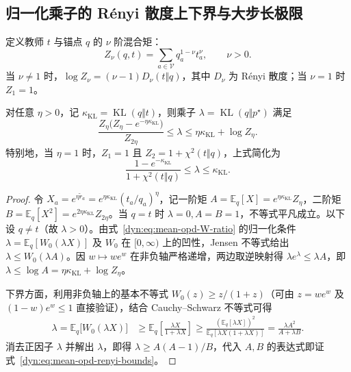 \documentclass[lang=cn,scheme=chinese,openany]{elegantbook}
\newcommand{\E}{\mathbb E}
\newcommand{\KL}{\operatorname{KL}}
\begin{document}
\subsection{归一化乘子的 R\'enyi 散度上下界与大步长极限}

定义教师 $t$ 与锚点 $q$ 的 $\nu$ 阶混合矩：
\begin{equation}
 Z_\nu(q,t)=\sum_{a\in\mathcal V} q_a^{1-\nu}t_a^\nu,
 \qquad \nu>0.
 \label{dyn:eq:mean-opd-renyi-Z}
\end{equation}
当 $\nu\ne 1$ 时，$\log Z_\nu=(\nu-1)D_\nu(t\Vert q)$，其中 $D_\nu$ 为 R\'enyi 散度；当 $\nu=1$ 时 $Z_1=1$。

\begin{proposition}
\label{dyn:prop:mean-opd-renyi-bounds}
对任意 $\eta>0$，记 $\kappa_{\mathrm{KL}}=\KL(q\Vert t)$，则乘子 $\lambda=\KL(q\Vert p^\star)$ 满足
\begin{equation}
 \frac{Z_\eta\bigl(Z_\eta-e^{-\eta\kappa_{\mathrm{KL}}}\bigr)}{Z_{2\eta}}
 \le\lambda\le\eta\kappa_{\mathrm{KL}}+\log Z_\eta.
 \label{dyn:eq:mean-opd-renyi-bounds}
\end{equation}
特别地，当 $\eta=1$ 时，$Z_1=1$ 且 $Z_2=1+\chi^2(t\Vert q)$，上式简化为
\begin{equation}
 \frac{1-e^{-\kappa_{\mathrm{KL}}}}{1+\chi^2(t\Vert q)}
 \le\lambda\le\kappa_{\mathrm{KL}}.
 \label{dyn:eq:mean-opd-eta-one-bounds}
\end{equation}
\end{proposition}
\begin{proof}
令 $X_a=e^{\eta\widetilde r_a}=e^{\eta\kappa_{\mathrm{KL}}}(t_a/q_a)^\eta$，记一阶矩 $A=\E_q[X]=e^{\eta\kappa_{\mathrm{KL}}}Z_\eta$，二阶矩 $B=\E_q[X^2]=e^{2\eta\kappa_{\mathrm{KL}}}Z_{2\eta}$。当 $q=t$ 时 $\lambda=0, A=B=1$，不等式平凡成立。以下设 $q\ne t$（故 $\lambda>0$）。由式~\eqref{dyn:eq:mean-opd-W-ratio} 的归一化条件 $\lambda=\E_q[W_0(\lambda X)]$ 及 $W_0$ 在 $[0,\infty)$ 上的凹性，Jensen 不等式给出 $\lambda\le W_0(\lambda A)$。因 $w\mapsto w e^w$ 在非负轴严格递增，两边取逆映射得 $\lambda e^\lambda\le \lambda A$，即 $\lambda\le\log A=\eta\kappa_{\mathrm{KL}}+\log Z_\eta$。

下界方面，利用非负轴上的基本不等式 $W_0(z)\ge z/(1+z)$（可由 $z=we^w$ 及 $(1-w)e^w\le 1$ 直接验证），结合 Cauchy--Schwarz 不等式可得
\begin{align*}
 \lambda=\E_q\bigl[W_0(\lambda X)\bigr]
 &\ge\E_q\left[\frac{\lambda X}{1+\lambda X}\right]
 \ge\frac{(\E_q[\lambda X])^2}{\E_q[\lambda X(1+\lambda X)]}
 =\frac{\lambda A^2}{A+\lambda B}.
\end{align*}
消去正因子 $\lambda$ 并解出 $\lambda$，即得 $\lambda\ge A(A-1)/B$，代入 $A,B$ 的表达式即证式~\eqref{dyn:eq:mean-opd-renyi-bounds}。
\end{proof}
\end{document}
